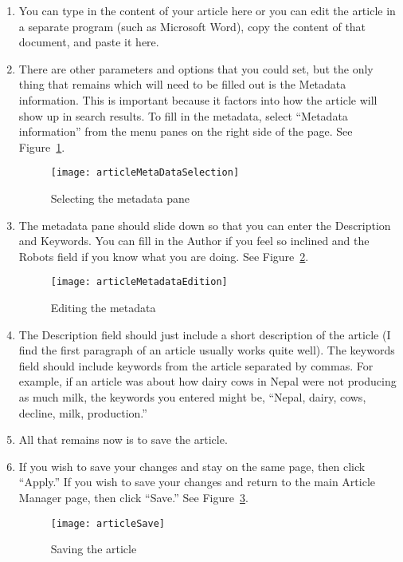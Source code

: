 \documentclass{howto}
\begin{document}
\begin{enumerate}
\item{You can type in the content of your article here or you can edit the article in a separate program (such as Microsoft Word), copy the content of that document, and paste it here.}

\item{There are other parameters and options that you could set, but the only thing that remains which will need to be filled out is the Metadata information.  This is important because it factors into how the article will show up in search results.  To fill in the metadata, select “Metadata information” from the menu panes on the right side of the page.  See Figure~\ref{metadataSelection}.}

  \begin{figure}[h]
    \begin{center}
      \texttt{[image: articleMetaDataSelection]}
    \end{center}
    \caption{Selecting the metadata pane}
    \label{metadataSelection}
  \end{figure}

\item{The metadata pane should slide down so that you can enter the Description and Keywords.  You can fill in the Author if you feel so inclined and the Robots field if you know what you are doing.  See Figure~\ref{metadataEdition}.}

\begin{figure}[h]
  \begin{center}
    \texttt{[image: articleMetadataEdition]}
  \end{center}
  \caption{Editing the metadata}
  \label{metadataEdition}
\end{figure}

\item{The Description field should just include a short description of the article (I find the first paragraph of an article usually works quite well).  The keywords field should include keywords from the article separated by commas.  For example, if an article was about how dairy cows in Nepal were not producing as much milk, the keywords you entered might be, “Nepal, dairy, cows, decline, milk, production.”}

\item{All that remains now is to save the article.}

\item{If you wish to save your changes and stay on the same page, then click “Apply.”  If you wish to save your changes and return to the main Article Manager page, then click “Save.” See Figure~\ref{save}.}

\begin{figure}[here]
  \begin{center}
   \texttt{[image: articleSave]}
  \end{center}
  \caption{Saving the article}
  \label{save}
\end{figure}

\end{enumerate}
\end{document}
